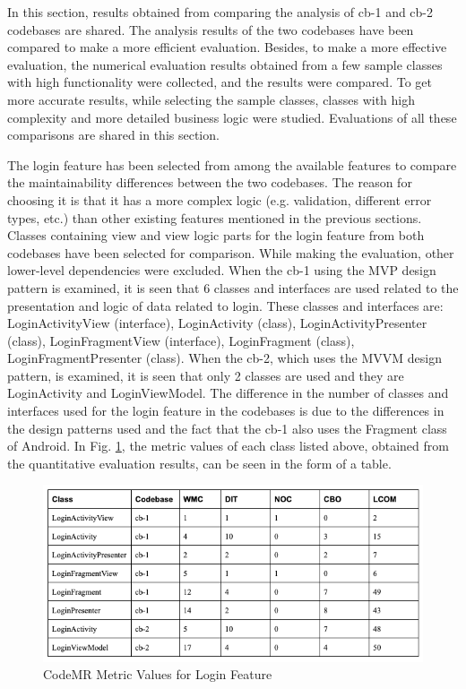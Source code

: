In this section, results obtained from comparing the analysis of cb-1 and cb-2 codebases are shared. The analysis results of the two codebases have been compared to make a more efficient evaluation. Besides, to make a more effective evaluation, the numerical evaluation results obtained from a few sample classes with high functionality were collected, and the results were compared. To get more accurate results, while selecting the sample classes, classes with high complexity and more detailed business logic were studied. Evaluations of all these comparisons are shared in this section.

The login feature has been selected from among the available features to compare the maintainability differences between the two codebases. The reason for choosing it is that it has a more complex logic (e.g. validation, different error types, etc.) than other existing features mentioned in the previous sections. Classes containing view and view logic parts for the login feature from both codebases have been selected for comparison. While making the evaluation, other lower-level dependencies were excluded. When the cb-1 using the MVP design pattern is examined, it is seen that 6 classes and interfaces are used related to the presentation and logic of data related to login. These classes and interfaces are: LoginActivityView (interface), LoginActivity (class), LoginActivityPresenter (class), LoginFragmentView (interface), LoginFragment (class), LoginFragmentPresenter (class). When the cb-2, which uses the MVVM design pattern, is examined, it is seen that only 2 classes are used and they are LoginActivity and LoginViewModel. The difference in the number of classes and interfaces used for the login feature in the codebases is due to the differences in the design patterns used and the fact that the cb-1 also uses the Fragment class of Android. In Fig. \ref{fig:login-metric-table}, the metric values of each class listed above, obtained from the quantitative evaluation results, can be seen in the form of a table.
\begin{figure}[ht!]
    \centering
    \includegraphics[scale=0.65]{figures/login-metric-table.png}
    \caption{CodeMR Metric Values for Login Feature}
    \label{fig:login-metric-table}
\end{figure}
\FloatBarrier


